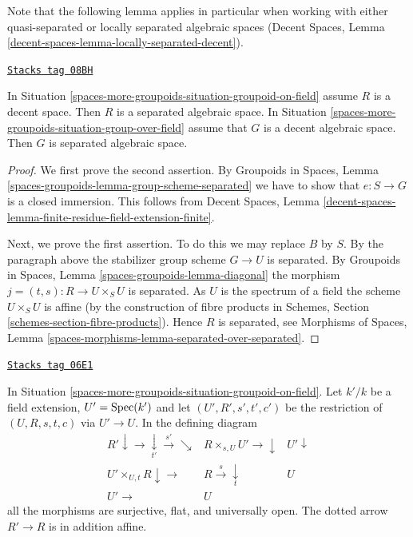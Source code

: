 Note that the following lemma applies in particular when working
with either quasi-separated or locally separated algebraic spaces
(Decent Spaces, Lemma \ref{decent-spaces-lemma-locally-separated-decent}).

\begin{lemma}
\label{spaces-more-groupoids-lemma-group-scheme-over-field-separated}
\href{https://stacks.math.columbia.edu/tag/08BH}{\texttt{Stacks tag 08BH}}

In Situation \ref{spaces-more-groupoids-situation-groupoid-on-field}
assume $R$ is a decent space. Then $R$ is a separated algebraic space.
In Situation \ref{spaces-more-groupoids-situation-group-over-field} assume that
$G$ is a decent algebraic space. Then $G$ is separated algebraic space.
\end{lemma}

\begin{proof}
We first prove the second assertion. By Groupoids in Spaces,
Lemma \ref{spaces-groupoids-lemma-group-scheme-separated}
we have to show that $e : S \to G$ is a closed immersion.
This follows from Decent Spaces, Lemma
\ref{decent-spaces-lemma-finite-residue-field-extension-finite}.

\medskip\noindent
Next, we prove the first assertion. To do this we may replace $B$ by $S$.
By the paragraph above the stabilizer group scheme $G \to U$ is separated. By
Groupoids in Spaces, Lemma \ref{spaces-groupoids-lemma-diagonal}
the morphism $j = (t, s) : R \to U \times_S U$ is separated.
As $U$ is the spectrum of a field the scheme
$U \times_S U$ is affine (by the construction of fibre products in
Schemes, Section \ref{schemes-section-fibre-products}).
Hence $R$ is separated, see
Morphisms of Spaces, Lemma
\ref{spaces-morphisms-lemma-separated-over-separated}.
\end{proof}

\begin{lemma}
\label{spaces-more-groupoids-lemma-restrict-groupoid-on-field}
\href{https://stacks.math.columbia.edu/tag/06E1}{\texttt{Stacks tag 06E1}}

In
Situation \ref{spaces-more-groupoids-situation-groupoid-on-field}.
Let $k'/k$ be a field extension, $U' = \operatorname{Spec}(k')$
and let $(U', R', s', t', c')$ be the restriction of
$(U, R, s, t, c)$ via $U' \to U$. In the defining diagram
$$
\begin{array}{ccc}R' \downarrow\longrightarrow\underset{t'}{\downarrow}\overset{s'}{\longrightarrow}\searrow & R \times_{s, U} U' \longrightarrow\downarrow & U' \downarrow \\ U' \times_{U, t} R \downarrow\longrightarrow & R \overset{s}{\longrightarrow}\underset{t}{\downarrow} & U \\ U' \longrightarrow & U & \end{array}
$$
all the morphisms are surjective, flat, and universally open.
The dotted arrow $R' \to R$ is in addition affine.
\end{lemma}

